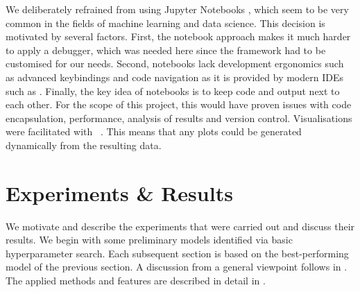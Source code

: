 \documentclass[
	fontsize=10pt, %
	twoside=false, %
	secnumdepth=1, %
  toc=indentunnumbered %
]{kaobook}
\begin{document}
We deliberately refrained from using Jupyter Notebooks
\cite{kluyver_JupyterNotebooksPublishing_2016}, which seem to be very common in
the fields of machine learning and data science. This decision is motivated by
several factors. First, the notebook approach makes it much harder to apply a
debugger, which was needed here since the  framework had to
be customised for our needs. Second, notebooks lack development ergonomics such
as advanced keybindings and code navigation as it is provided by modern IDEs
such as . Finally, the key idea of notebooks is to keep code and
output next to each other. For the scope of this project, this would have proven
issues with code encapsulation, performance, analysis of results and version
control.
Visualisations were facilitated with
~\cite{caswell_MatplotlibMatplotlibREL_2021}. This means that
any plots could be generated dynamically from the resulting data.







% 



\chapter{Experiments \& Results}
\label{sec:experiments-results}

We motivate and describe the experiments that were carried out and discuss their
results. We begin with some preliminary models identified via basic
hyperparameter search. Each subsequent section is based on the best-performing
model of the previous section. A discussion from a general viewpoint follows in
. The applied methods and features are described in detail in
.
\end{document}
